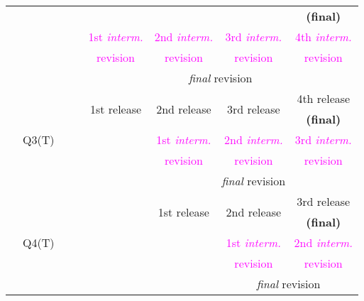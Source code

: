 \begin{table}[H]
\begin{minipage}[t]{1\columnwidth}
\begin{center}
\begin{tabular}{|c|c|c|c|c|c|c|c|}
 &  &  &  &  &  &  & \textbf{\small{}(final)}\tabularnewline
\cline{4-8} \cline{5-8} \cline{6-8} \cline{7-8} \cline{8-8} 
 &  &  & \multirow{3}{*}{} & \textcolor{magenta}{\small{}1st }\textcolor{magenta}{\emph{\small{}interm.}} & \textcolor{magenta}{\small{}2nd }\textcolor{magenta}{\emph{\small{}interm.}} & \textcolor{magenta}{\small{}3rd }\textcolor{magenta}{\emph{\small{}interm.}} & \textcolor{magenta}{\small{}4th }\textcolor{magenta}{\emph{\small{}interm.}}\tabularnewline
 &  &  &  & \textcolor{magenta}{\small{}revision} & \textcolor{magenta}{\small{}revision} & \textcolor{magenta}{\small{}revision} & \textcolor{magenta}{\small{}revision}\tabularnewline
\cline{5-8} \cline{6-8} \cline{7-8} \cline{8-8} 
 &  &  &  & \multicolumn{4}{c|}{\emph{final} revision}\tabularnewline
\cline{2-8} \cline{3-8} \cline{4-8} \cline{5-8} \cline{6-8} \cline{7-8} \cline{8-8} 
 & \multirow{5}{*}{{\small{}Q3(T)}} & \multirow{5}{*}{} & \multirow{5}{*}{} & \multirow{2}{*}{{\small{}1st release}} & \multirow{2}{*}{{\small{}2nd release}} & \multirow{2}{*}{{\small{}3rd release}} & {\small{}4th release }\tabularnewline
 &  &  &  &  &  &  & \textbf{\small{}(final)}\tabularnewline
\cline{5-8} \cline{6-8} \cline{7-8} \cline{8-8} 
 &  &  &  & \multirow{3}{*}{} & \textcolor{magenta}{\small{}1st }\textcolor{magenta}{\emph{\small{}interm.}} & \textcolor{magenta}{\small{}2nd }\textcolor{magenta}{\emph{\small{}interm.}} & \textcolor{magenta}{\small{}3rd }\textcolor{magenta}{\emph{\small{}interm.}}\tabularnewline
 &  &  &  &  & \textcolor{magenta}{\small{}revision} & \textcolor{magenta}{\small{}revision} & \textcolor{magenta}{\small{}revision}\tabularnewline
\cline{6-8} \cline{7-8} \cline{8-8} 
 &  &  &  &  & \multicolumn{3}{c|}{\emph{final} revision}\tabularnewline
\cline{2-8} \cline{3-8} \cline{4-8} \cline{5-8} \cline{6-8} \cline{7-8} \cline{8-8} 
 & \multirow{5}{*}{{\small{}Q4(T)}} & \multirow{5}{*}{} & \multirow{5}{*}{} & \multirow{5}{*}{} & \multirow{2}{*}{{\small{}1st release}} & \multirow{2}{*}{{\small{}2nd release}} & {\small{}3rd release }\tabularnewline
 &  &  &  &  &  &  & \textbf{\small{}(final)}\tabularnewline
\cline{6-8} \cline{7-8} \cline{8-8} 
 &  &  &  &  & \multirow{3}{*}{} & \textcolor{magenta}{\small{}1st }\textcolor{magenta}{\emph{\small{}interm.}} & \textcolor{magenta}{\small{}2nd }\textcolor{magenta}{\emph{\small{}interm.}}\tabularnewline
 &  &  &  &  &  & \textcolor{magenta}{\small{}revision} & \textcolor{magenta}{\small{}revision}\tabularnewline
\cline{7-8} \cline{8-8} 
 &  &  &  &  &  & \multicolumn{2}{c|}{\emph{final} revision}\tabularnewline
\hline 
\end{tabular}
\par\end{center}%
\end{minipage}
\end{table}

